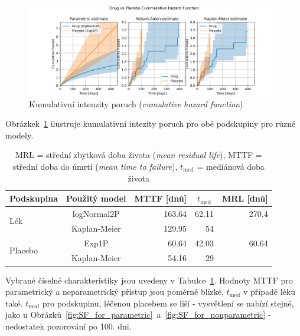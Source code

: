 \documentclass[a4, 11pt]{article}
\theoremstyle{definition}
\theoremstyle{remark}
\begin{document}
   	\begin{figure}[H]
        \centering
        \includegraphics[width=1.0\linewidth]{img/cumulative_hazard_function_drug_vs_placebo_TRIPLE.png}
        \caption{Kumulativní intenzity poruch (\textit{cumulative hazard function})}
        \label{fig:CHF_for_parametric}
    \end{figure}     
    
    Obrázkek~\ref{fig:CHF_for_parametric} ilustruje kumulativní intezity poruch pro obě podskupiny pro různé modely. 
 
\begin{table}[H]
    \centering
    \begin{tabular}{@{}lcrrr@{}}
        \toprule
        \multicolumn{1}{c}{Podskupina} & Použitý model & \multicolumn{1}{c}{MTTF {[}dnů{]}} & \multicolumn{1}{c}{$t_{\mbox{med}}$} & \multicolumn{1}{c}{MRL {[}dnů{]}} \\ \midrule
        \multirow{2}{*}{Lék}     & logNormal2P  & 163.64 & 62.11 & 270.4 \\
        & Kaplan-Meier & 129.95 & 54    &       \\
        \multirow{2}{*}{Placebo} & Exp1P        & 60.64  & 42.03 & 60.64 \\
        & Kaplan-Meier & 54.16  & 29    &       \\ \bottomrule
    \end{tabular}
    \caption{MRL = střední zbytková doba života (\textit{mean residual life}), MTTF = střední doba do úmrtí (\textit{mean time to failure}), $t_{\mbox{med}}$ = mediánová doba života}
    \label{tab:statistics}
\end{table}

    Vybrané číselné charakteristiky jsou uvedeny v Tabulce~\ref{tab:statistics}. Hodnoty MTTF pro parametrický a neparametrický přístup jsou poměrně blízké, $t_{\mbox{med}}$ v případě léku také. $t_{\mbox{med}}$ pro podskupinu, léčenou placebem se liší - vysvětlení se nabízí stejné, jako u Obrázků~\ref{fig:SF_for_parametric}~a~\ref{fig:SF_for_nonparametric} - nedostatek pozorování po 100. dni.
    
\end{document}
